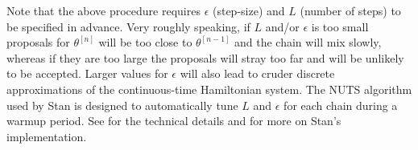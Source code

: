 Note that the above procedure requires $\epsilon$ (step-size) and $L$ (number of steps) to be specified in 
advance. Very roughly speaking, if $L$ and/or $\epsilon$ is too small proposals for $\theta^{[n]}$ will be too 
close to $\theta^{[n-1]}$ and the chain will mix slowly, whereas if they are too large the proposals will stray 
too far and will be unlikely to be accepted. Larger values for $\epsilon$ will also lead to cruder discrete
approximations of the continuous-time Hamiltonian system. The NUTS algorithm  
used by Stan is designed to automatically tune $L$ and $\epsilon$ for each chain during a warmup period. 
See  for the technical details and  for more 
on Stan's implementation. 




